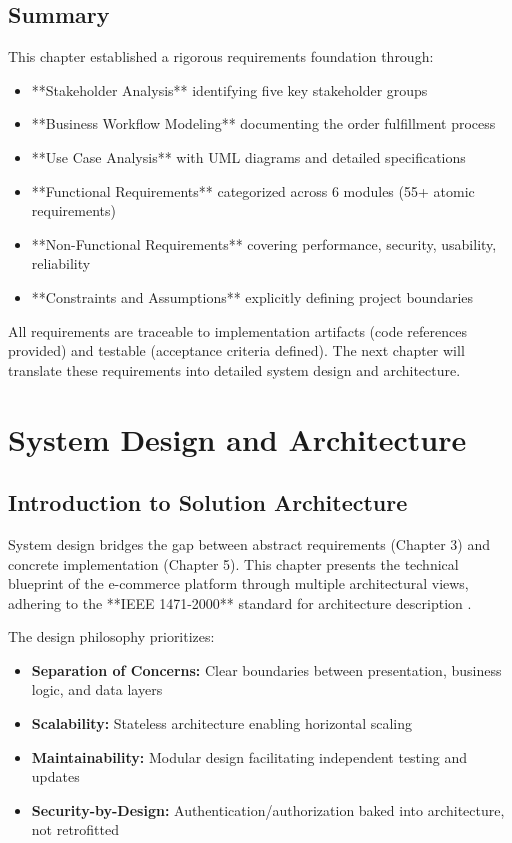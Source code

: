 \documentclass[12pt, a4paper]{report}
\begin{document}
\section{Summary}

This chapter established a rigorous requirements foundation through:

\begin{itemize}
    \item **Stakeholder Analysis** identifying five key stakeholder groups
    \item **Business Workflow Modeling** documenting the order fulfillment process
    \item **Use Case Analysis** with UML diagrams and detailed specifications
    \item **Functional Requirements** categorized across 6 modules (55+ atomic requirements)
    \item **Non-Functional Requirements** covering performance, security, usability, reliability
    \item **Constraints and Assumptions** explicitly defining project boundaries
\end{itemize}

All requirements are traceable to implementation artifacts (code references provided) and testable (acceptance criteria defined). The next chapter will translate these requirements into detailed system design and architecture.


\chapter{System Design and Architecture}

\section{Introduction to Solution Architecture}

System design bridges the gap between abstract requirements (Chapter 3) and concrete implementation (Chapter 5). This chapter presents the technical blueprint of the e-commerce platform through multiple architectural views, adhering to the **IEEE 1471-2000** standard for architecture description \cite{ieee1471}.

The design philosophy prioritizes:
\begin{itemize}
    \item \textbf{Separation of Concerns:} Clear boundaries between presentation, business logic, and data layers
    \item \textbf{Scalability:} Stateless architecture enabling horizontal scaling
    \item \textbf{Maintainability:} Modular design facilitating independent testing and updates
    \item \textbf{Security-by-Design:} Authentication/authorization baked into architecture, not retrofitted
\end{itemize}
\end{document}

